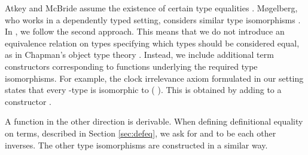 \begin{AgdaAlign}
Atkey and McBride assume the existence of certain type equalities
\cite{atkey2013productive}. M{\o}gelberg, who works in a dependently typed setting, considers similar type isomorphisms \cite{Mogelberg14}. In \GTT, we
follow the second approach. This means that we do not introduce an
equivalence relation on types specifying which types should be
considered equal, as in Chapman's object type theory
\cite{Chapman09}. Instead, we include additional term constructors
corresponding to functions underlying the required type
isomorphisms. For example, the clock irrelevance axiom formulated in our setting states that every -type  is isomorphic to  ( ). This is obtained by adding to  a constructor .
\begin{code}%
%
\>[4]\AgdaSpace{}%
\AgdaSymbol{:}\AgdaSpace{}%
\AgdaSymbol{\{}\AgdaSpace{}%
\AgdaSymbol{:}\AgdaSpace{}%
\AgdaSpace{}%
\AgdaSymbol{\}}\AgdaSpace{}%
\AgdaSymbol{(}\AgdaSpace{}%
\AgdaSymbol{:}\AgdaSpace{}%
\AgdaSpace{}%
\AgdaSymbol{)}\AgdaSpace{}%
\AgdaSpace{}%
\AgdaSpace{}%
\AgdaSpace{}%
\AgdaSymbol{(}\AgdaSpace{}%
\AgdaSymbol{(}\AgdaSpace{}%
\AgdaSymbol{)}\AgdaSpace{}%
\AgdaSpace{}%
\AgdaSymbol{)}\<%
\end{code}
A function   in the other direction is derivable.
When defining definitional equality on terms, described in Section \ref{sec:defeq}, we
ask for  and  to be each other inverses.
The other type isomorphisms are constructed in a similar way.
\end{AgdaAlign}
